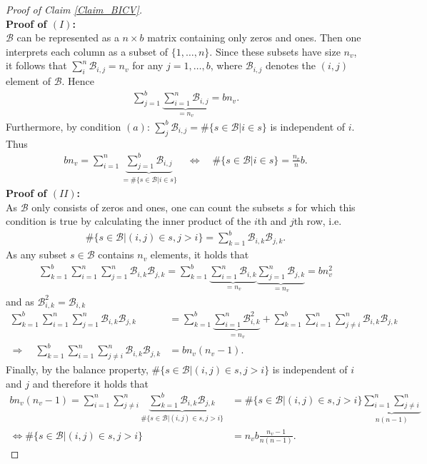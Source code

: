 \documentclass[Research_Module_ES.tex]{subfiles}
\begin{document}
\begin{proof}[Proof of Claim \ref{Claim_BICV}]~\\
	\textbf{Proof of $(I)$:}\\
	$\mathcal{B}$ can be represented as a $n\times b$ matrix containing only zeros and ones. Then one interprets each column as a subset of $\{ 1,\dots,n\}$. Since these subsets have size $n_v$, it follows that $\sum_i^n \mathcal{B}_{i,j}=n_v$ for any $j= 1, \dots ,b$, where $\mathcal{B}_{i,j}$ denotes the $(i,j)$ element of $\mathcal{B}$. Hence
	\begin{align*}
	\sum_{j=1}^b\underbrace{\sum_{i=1}^n \mathcal{B}_{i,j}}_{=n_v} = bn_v.
	\end{align*}
	Furthermore, by condition $(a)$: $\sum_j^b \mathcal{B}_{i,j} = \#\{s\in \mathcal{B}| i\in s\}$ is independent of $i$. Thus 
	\begin{align*}
	bn_v = \sum_{i=1}^n\underbrace{\sum_{j=1}^b \mathcal{B}_{i,j}}_{=\#\{s\in \mathcal{B}| i\in s\}} \quad
	\iff \quad \#\{s\in \mathcal{B}| i\in s\} = \frac{n_v}{n}b. 
	\end{align*} 
	\textbf{Proof of $(II)$:}\\
	As $\mathcal{B}$ only consists of zeros and ones, one can count the subsets $s$ for which this condition is true by calculating the inner product of the $i$th and $j$th row, i.e.
	\begin{align*}
	\#\{s\in\mathcal{B}|(i,j)\in s, j>i\} = \sum_{k=1}^b\mathcal{B}_{i,k}\mathcal{B}_{j,k}.
	\end{align*}
	As any subset $s \in \mathcal{B}$ contains $n_v$ elements, it holds that
	\begin{align*}
	\sum_{k=1}^b\sum_{i=1}^n\sum_{j=1}^n\mathcal{B}_{i,k}\mathcal{B}_{j,k}= \sum_{k=1}^b\underbrace{\sum_{i=1}^n\mathcal{B}_{i,k}}_{=n_v}\underbrace{\sum_{j=1}^n\mathcal{B}_{j,k}}_{=n_v}=bn_v^2
	\end{align*}
	and as $\mathcal{B}_{i,k}^2=\mathcal{B}_{i,k}$
	\begin{align*}
	\sum_{k=1}^b\sum_{i=1}^n\sum_{j=1}^n\mathcal{B}_{i,k}\mathcal{B}_{j,k} &= \sum_{k=1}^b\underbrace{\sum_{i=1}^n\mathcal{B}_{i,k}^2}_{=n_v} +\sum_{k=1}^b\sum_{i=1}^n\sum_{j\neq i}^n\mathcal{B}_{i,k}\mathcal{B}_{j,k}\\
	\Rightarrow \quad \sum_{k=1}^b\sum_{i=1}^n\sum_{j\neq i}^n\mathcal{B}_{i,k}\mathcal{B}_{j,k} &= bn_v(n_v-1).
	\end{align*}
	Finally, by the balance property, $\#\{s\in\mathcal{B}|(i,j)\in s, j>i\}$ is independent of $i$ and $j$ and therefore it holds that
	\begin{align*}
	bn_v(n_v-1) = \sum_{i=1}^n\sum_{j\neq i}^n\underbrace{\sum_{k=1}^b\mathcal{B}_{i,k}\mathcal{B}_{j,k}}_{\#\{s\in\mathcal{B}|(i,j)\in s, j>i\}}&=\#\{s\in\mathcal{B}|(i,j)\in s, j>i\}\underbrace{\sum_{i=1}^n\sum_{j\neq i}^n}_{n(n-1)}\\
	\iff \#\{s\in\mathcal{B}|(i,j)\in s, j>i\}&=n_vb\frac{n_v-1}{n(n-1)}.
	\end{align*}
\end{proof} 
\end{document}
